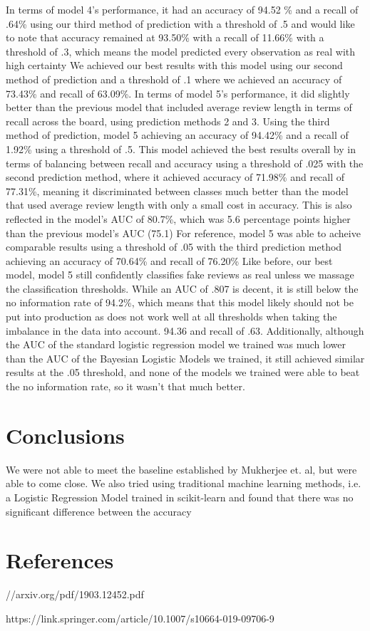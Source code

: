  In terms of model 4's performance, it had an accuracy of 94.52 \% and a recall of .64\% using our third method of prediction with a threshold of .5 and would like to note that accuracy remained at 93.50\% with a recall of 11.66\% with a threshold of .3, which means the model predicted every observation as real with high certainty We achieved our best results with this model using our second method of prediction and a threshold of .1 where we achieved an accuracy of 73.43\% and recall of 63.09\%. In terms of model 5's performance, it did slightly better than the previous model that included average review length in terms of recall across the board, using prediction methods 2 and 3. Using the third method of prediction, model 5 achieving an accuracy of 94.42\% and a recall of 1.92\% using a threshold of .5. This model achieved the best results overall by in terms of balancing between recall and accuracy using a threshold of .025 with the second prediction method, where it achieved accuracy of 71.98\% and recall of 77.31\%, meaning it discriminated between classes much better than the model that used average review length with only a small cost in accuracy. This is also reflected in the model's AUC of 80.7\%, which was 5.6 percentage points higher than the previous model's AUC (75.1) For reference, model 5 was able to acheive comparable results using a threshold of .05 with the third prediction method achieving an accuracy of 70.64\% and recall of 76.20\% Like before, our best model, model 5 still confidently classifies fake reviews as real unless we massage the classification thresholds. While an AUC of .807 is decent, it is still below the no information rate of 94.2\%, which means that this model likely should not be put into production as does not work well at all thresholds when taking the imbalance in the data into account.  94.36 and recall of .63. Additionally, although the AUC of the standard logistic regression model we trained was much lower than the AUC of the Bayesian Logistic Models we trained, it still achieved similar results at the .05 threshold, and none of the models we trained were able to beat the no information rate, so it wasn't that much better. 


\section{Conclusions} 

We were not able to meet the baseline established by Mukherjee et. al, but were able to come close. We also tried using traditional machine learning methods, i.e. a Logistic Regression Model trained in scikit-learn and found that there was no significant difference between the accuracy 
\section{References}

//arxiv.org/pdf/1903.12452.pdf

https://link.springer.com/article/10.1007/s10664-019-09706-9

